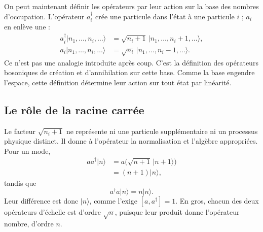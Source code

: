On peut maintenant définir les opérateurs par leur action sur la base des nombres d’occupation. L’opérateur \(a_i^\dagger\) crée une particule dans l’état à une particule \(i\) ; \(a_i\) en enlève une :
\begin{align}
a_i^\dagger|n_1,\ldots,n_i,\ldots\rangle
&=\sqrt{n_i+1}\,|n_1,\ldots,n_i+1,\ldots\rangle, \\
a_i|n_1,\ldots,n_i,\ldots\rangle
&=\sqrt{n_i}\,|n_1,\ldots,n_i-1,\ldots\rangle.
\end{align}
Ce n’est pas une analogie introduite après coup. C’est la définition des opérateurs bosoniques de création et d’annihilation sur cette base. Comme la base engendre l’espace, cette définition détermine leur action sur tout état par linéarité.

\begin{classroomqa}\end{classroomqa}

\subsection{Le rôle de la racine carrée}

Le facteur \(\sqrt{n_i+1}\) ne représente ni une particule supplémentaire ni un processus physique distinct. Il donne à l’opérateur la normalisation et l’algèbre appropriées. Pour un mode,
\begin{align}
a a^\dagger|n\rangle
&=a\bigl(\sqrt{n+1}\,|n+1\rangle\bigr) \\
&=(n+1)|n\rangle,
\end{align}
tandis que
\begin{equation}
a^\dagger a|n\rangle=n|n\rangle.
\end{equation}
Leur différence est donc \(|n\rangle\), comme l’exige \([a,a^\dagger]=1\). En gros, chacun des deux opérateurs d’échelle est d’ordre \(\sqrt n\), puisque leur produit donne l’opérateur nombre, d’ordre \(n\).

\begin{classroomqa}\end{classroomqa}

